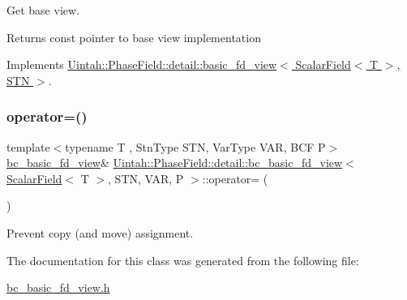Get base view. 

\begin{DoxyReturn}{Returns}
const pointer to base view implementation 
\end{DoxyReturn}


Implements \hyperlink{classUintah_1_1PhaseField_1_1detail_1_1basic__fd__view_3_01ScalarField_3_01T_01_4_00_01STN_01_4_a006d6f7c6fd81ff2c8d53f59656a23dc}{Uintah\+::\+Phase\+Field\+::detail\+::basic\+\_\+fd\+\_\+view$<$ Scalar\+Field$<$ T $>$, S\+T\+N $>$}.

\mbox{\label{classUintah_1_1PhaseField_1_1detail_1_1bc__basic__fd__view_3_01ScalarField_3_01T_01_4_00_01STN_00_01VAR_00_01P_01_4_af7343355f3109a8891a073e9aeb7bf9a}} 
\subsubsection{\texorpdfstring{operator=()}{operator=()}}
{\footnotesize\ttfamily template$<$typename T , Stn\+Type S\+TN, Var\+Type V\+AR, B\+CF P$>$ \\
\hyperlink{classUintah_1_1PhaseField_1_1detail_1_1bc__basic__fd__view}{bc\+\_\+basic\+\_\+fd\+\_\+view}\& \hyperlink{classUintah_1_1PhaseField_1_1detail_1_1bc__basic__fd__view}{Uintah\+::\+Phase\+Field\+::detail\+::bc\+\_\+basic\+\_\+fd\+\_\+view}$<$ \hyperlink{structUintah_1_1PhaseField_1_1ScalarField}{Scalar\+Field}$<$ T $>$, S\+TN, V\+AR, P $>$\+::operator= (\begin{DoxyParamCaption}\item[{const \hyperlink{classUintah_1_1PhaseField_1_1detail_1_1bc__basic__fd__view}{bc\+\_\+basic\+\_\+fd\+\_\+view}$<$ \hyperlink{structUintah_1_1PhaseField_1_1ScalarField}{Scalar\+Field}$<$ T $>$, S\+TN, V\+AR, P $>$ \&}]{ }\end{DoxyParamCaption})\hspace{0.3cm}{\ttfamily [delete]}}



Prevent copy (and move) assignment. 



The documentation for this class was generated from the following file\+:\begin{DoxyCompactItemize}
\item 
\hyperlink{bc__basic__fd__view_8h}{bc\+\_\+basic\+\_\+fd\+\_\+view.\+h}\end{DoxyCompactItemize}
